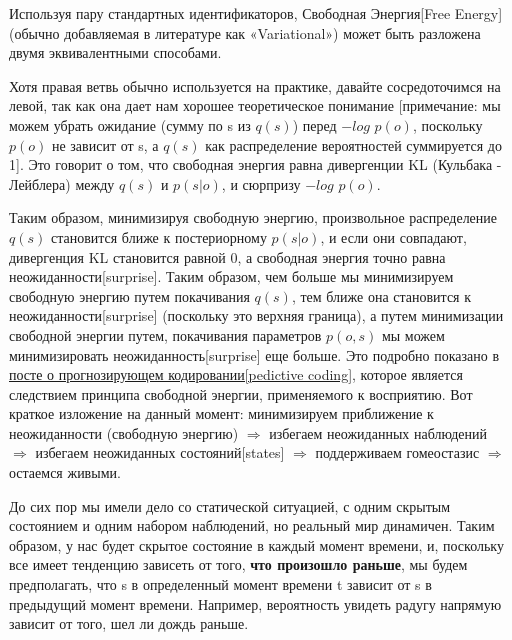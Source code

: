 \documentclass[twoside,leqno, 11pt]{article}
\begin{document}
	Используя пару стандартных идентификаторов, Свободная Энергия[Free Energy] (обычно добавляемая в литературе как «Variational») может быть разложена двумя эквивалентными способами.
	
	
	Хотя правая ветвь обычно используется на практике, давайте сосредоточимся на левой, так как она дает нам хорошее теоретическое понимание [примечание: мы можем убрать ожидание (сумму по s из $q(s)$) перед $-log$ $p(o)$, поскольку $p(o)$ не зависит от s, а $q(s)$ как распределение вероятностей суммируется до 1]. Это говорит о том, что свободная энергия равна дивергенции KL (Кульбака - Лейблера) между $q(s)$ и $p(s|o)$, и сюрпризу $-log$ $p(o)$.
	
	
	Таким образом, минимизируя свободную энергию, произвольное распределение $q(s)$ становится ближе к постериорному $p(s|o)$, и если они совпадают, дивергенция KL становится равной 0, а свободная энергия точно равна неожиданности[surprise]. Таким образом, чем больше мы минимизируем свободную энергию путем покачивания $q(s)$, тем ближе она становится к неожиданности[surprise] (поскольку это верхняя граница), а путем минимизации свободной энергии путем, покачивания параметров $p(o,s)$ мы можем минимизировать неожиданность[surprise] еще больше. Это подробно показано в  \href{https://medium.com/@solopchuk/intuitions-on-predictive-coding-and-the-free-energy-principle-3fc5bcedc754}{посте о прогнозирующем кодировании[pedictive coding]}, которое является следствием принципа свободной энергии, применяемого к восприятию. Вот краткое изложение на данный момент: минимизируем приближение к неожиданности (свободную энергию) $\Rightarrow$ избегаем неожиданных наблюдений $\Rightarrow$ избегаем неожиданных состояний[states] $\Rightarrow$ поддерживаем гомеостазис $\Rightarrow$ остаемся живыми.
	
	До сих пор мы имели дело со статической ситуацией, с одним скрытым состоянием и одним набором наблюдений, но реальный мир динамичен. Таким образом, у нас будет скрытое состояние в каждый момент времени, и, поскольку все имеет тенденцию зависеть от того, \textbf{что произошло раньше}, мы будем предполагать, что s в определенный момент времени t зависит от s в предыдущий момент времени. Например, вероятность увидеть радугу напрямую зависит от того, шел ли дождь раньше.
	
\end{document}
